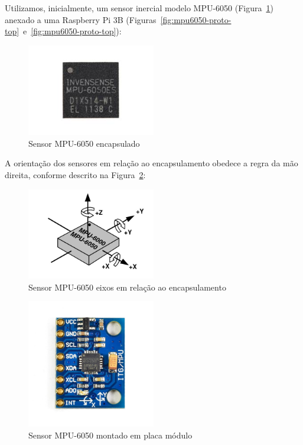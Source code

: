 Utilizamos, inicialmente, um sensor inercial modelo MPU-6050 (Figura~\ref{fig:mpu6050-sensor-top}) anexado a uma Raspberry Pi 3B (Figuras~\ref{fig:mpu6050-proto-top}~e~\ref{fig:mpu6050-proto-top}):
\begin{figure}[H]
    \centering
    \caption{Sensor MPU-6050 encapsulado}\label{fig:mpu6050-sensor-top}
    \includegraphics[width=0.5\textwidth]{figuras/mpu6050-sensor-top-straight.jpg}
\end{figure}
A orientação dos sensores em relação ao encapsulamento obedece a regra da mão direita, conforme descrito na Figura~\ref{fig:mpu6050-diagram-axis}:
\begin{figure}[H]
    \centering
    \caption{Sensor MPU-6050 eixos em relação ao encapsulamento}\label{fig:mpu6050-diagram-axis}
    \includegraphics[width=0.5\textwidth]{figuras/mpu6050-diagram-axis.jpg}
\end{figure}
\begin{figure}[H]
    \centering
    \caption{Sensor MPU-6050 montado em placa módulo}\label{fig:mpu6050-board-top}
    \includegraphics[width=0.5\textwidth]{figuras/mpu6050-board-top.jpg}
\end{figure}
